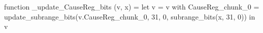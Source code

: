function _update_CauseReg_bits (v, x) = let v = { v with CauseReg_chunk_0 = update_subrange_bits(v.CauseReg_chunk_0, 31, 0, subrange_bits(x, 31, 0)) } in
  v
